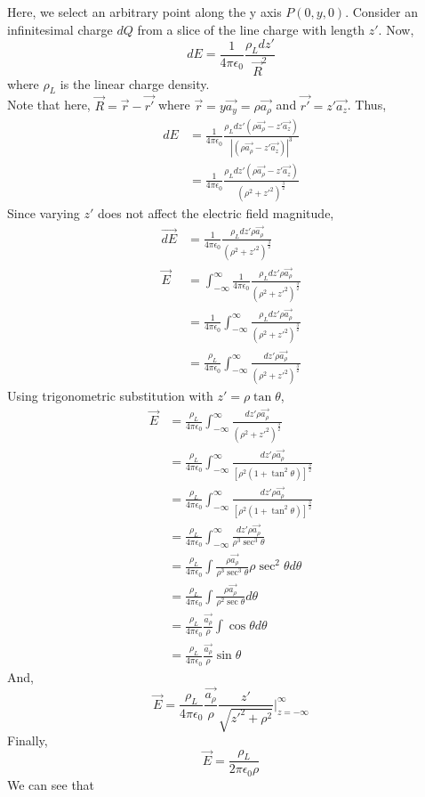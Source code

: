\documentclass{article}
\begin{document}
\noindent
Here, we select an arbitrary point along the y axis $P(0,y,0)$.
\newpage 
\noindent 
Consider an infinitesimal charge $dQ$ from a slice of the line charge with length $z'$.
Now, $$dE = \frac{1}{4\pi\epsilon_0}\frac{\rho_L dz'}{\vec{R}^2}$$ where $\rho_L$ is
the linear charge density.
\vspace{8pt}
\\ Note that here, $\vec{R} = \vec{r} - \vec{r'}$ where $\vec{r} = y\vec{a_y} = 
\rho\vec{a_\rho}$ and $\vec{r'} = z'\vec{a_z}$. Thus, 
\begin{align*}
dE &= \frac{1}{4\pi\epsilon_0} \frac{\rho_L dz' (\rho\vec{a_\rho} - z'\vec{a_z})}
{|(\rho\vec{a_\rho} - z'\vec{a_z})|^3} \\
&= \frac{1}{4\pi\epsilon_0}\frac{\rho_L dz' (\rho\vec{a_\rho} - z'\vec{a_z})}
{(\rho^2 + z'^2)^\frac{3}{2}}
\end{align*}
Since varying $z'$ does not affect the electric field magnitude, 
\begin{align*}
\vec{dE} &= \frac{1}{4\pi\epsilon_0}\frac{\rho_L dz' \rho\vec{a_\rho}}
{(\rho^2 + z'^2)^\frac{3}{2}}\\
\vec{E} &= \int_{-\infty}^{\infty}\frac{1}{4\pi\epsilon_0}\frac{\rho_L dz' \rho\vec{a_\rho}}
{(\rho^2 + z'^2)^\frac{3}{2}}\\
&= \frac{1}{4\pi\epsilon_0} \int_{-\infty}^{\infty}\frac{\rho_L dz' \rho\vec{a_\rho}}
{(\rho^2 + z'^2)^\frac{3}{2}}\\
&= \frac{\rho_L}{4\pi\epsilon_0} \int_{-\infty}^{\infty}\frac{dz' \rho\vec{a_\rho}}
{(\rho^2 + z'^2)^\frac{3}{2}}
\end{align*}
Using trigonometric substitution with $z' =\rho \tan\theta$,
\begin{align*}
\vec{E} &= \frac{\rho_L}{4\pi\epsilon_0} \int_{-\infty}^{\infty}\frac{dz' \rho\vec{a_\rho}}
{(\rho^2 + z'^2)^\frac{3}{2}}\\
&= \frac{\rho_L}{4\pi\epsilon_0} \int_{-\infty}^{\infty}\frac{dz' \rho\vec{a_\rho}}
{[\rho^2(1+\tan^2\theta)]^\frac{3}{2}}\\
&= \frac{\rho_L}{4\pi\epsilon_0} \int_{-\infty}^{\infty}\frac{dz' \rho\vec{a_\rho}}
{[\rho^2(1+\tan^2\theta)]^\frac{3}{2}}\\
&= \frac{\rho_L}{4\pi\epsilon_0} \int_{-\infty}^{\infty}\frac{dz' \rho\vec{a_\rho}}
{\rho^3 \sec^3\theta}\\
&= \frac{\rho_L}{4\pi\epsilon_0} \int\frac{\rho\vec{a_\rho}}
{\rho^3 \sec^3\theta}\rho\sec^2\theta d\theta\\
&= \frac{\rho_L}{4\pi\epsilon_0} \int\frac{\rho\vec{a_\rho}}
{\rho^2 \sec\theta}d\theta \\
&= \frac{\rho_L}{4\pi\epsilon_0}\frac{\vec{a_\rho}}{\rho}\int
\cos\theta d\theta \\
&= \frac{\rho_L}{4\pi\epsilon_0}\frac{\vec{a_\rho}}{\rho}\sin\theta
\end{align*}
\noindent 
And,
\begin{equation*}
\vec{E}= \frac{\rho_L}{4\pi\epsilon_0}\frac{\vec{a_\rho}}{\rho}\frac{z'}{\sqrt{
    z'^2+\rho^2}} \Bigg|_{z=-\infty}^{\infty}
\end{equation*}
Finally,
$$ \boxed{\vec{E} = \frac{\rho_L}{2\pi\epsilon_0\rho}}$$
We can see that 
\end{document}
